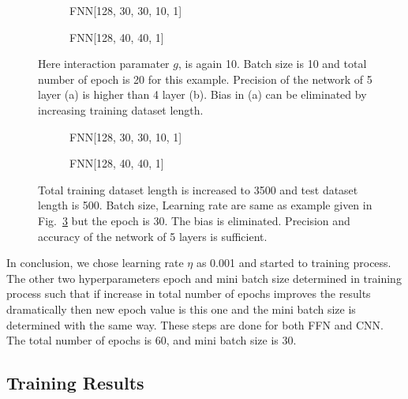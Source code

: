 \documentclass[a4paper,times,12pt]{article}
\begin{document}
\begin{figure}[H]
    \centering
    \begin{subfigure}[t]{0.45\textwidth}
           \centering
            
            \caption{FNN[128, 30, 30, 10, 1]}
            \label{fig:a}
    \end{subfigure}
    \begin{subfigure}[t]{0.45\textwidth}
            \centering
             
            \caption{FNN[128, 40, 40, 1]}
            \label{fig:b}
    \end{subfigure}
    \caption{Here interaction paramater $g$, is again 10. Batch size is 10 and total number of epoch is 20 for this example. Precision of the network of 5 layer (a) is higher than 4 layer (b). Bias in (a) can be eliminated by increasing training dataset length.}
\label{fig:network_layer_increment}
\end{figure}

\begin{figure}[H]
    \centering
    \begin{subfigure}[t]{0.45\textwidth}
		\centering
        
        \caption{FNN[128, 30, 30, 10, 1]}
		\label{fig:a}
    \end{subfigure}
    \begin{subfigure}[t]{0.45\textwidth}
        \centering
        
        \caption{FNN[128, 40, 40, 1]}
		\label{fig:b}
    \end{subfigure}
    \caption{Total training dataset length is increased to 3500 and test dataset length is 500. Batch size, Learning rate are same as example given in Fig.~\ref{fig:network_layer_increment} but the epoch is 30. The bias is eliminated. Precision and accuracy of the network of 5 layers is sufficient.}
\end{figure}

In conclusion, we chose learning rate $\eta$ as 0.001 and started to training process. The other two hyperparameters epoch and mini batch size determined in training process such that if increase in total number of epochs improves the results dramatically then new epoch value is this one and the mini batch size is determined with the same way. These steps are done for both FFN and CNN. The total number of epochs is 60, and mini batch size is 30. 


\subsection{Training Results}
\end{document}

